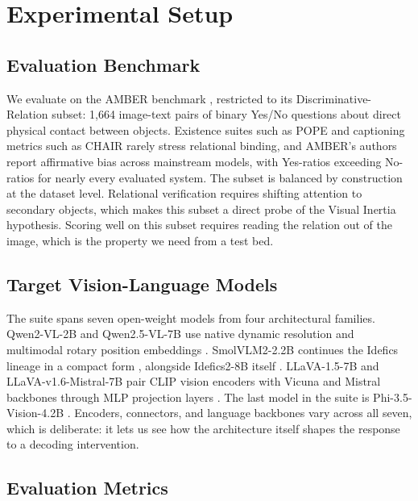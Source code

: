 \documentclass[pdflatex,sn-basic,Numbered]{sn-jnl}
\theoremstyle{thmstyleone}
\theoremstyle{thmstyletwo}
\theoremstyle{thmstylethree}
\begin{document}
\section{Experimental Setup}\label{sec:experiments}

\subsection{Evaluation Benchmark}\label{subsec:benchmark}

We evaluate on the AMBER benchmark \cite{wang2023amber}, restricted to its Discriminative-Relation subset: 1,664 image-text pairs of binary Yes/No questions about direct physical contact between objects. Existence suites such as POPE \cite{li2023bevaluating} and captioning metrics such as CHAIR \cite{rohrbach2018object} rarely stress relational binding, and AMBER's authors report affirmative bias across mainstream models, with Yes-ratios exceeding No-ratios for nearly every evaluated system. The subset is balanced by construction at the dataset level. Relational verification requires shifting attention to secondary objects, which makes this subset a direct probe of the Visual Inertia hypothesis. Scoring well on this subset requires reading the relation out of the image, which is the property we need from a test bed.

\subsection{Target Vision-Language Models}\label{subsec:models}

The suite spans seven open-weight models from four architectural families. Qwen2-VL-2B and Qwen2.5-VL-7B use native dynamic resolution and multimodal rotary position embeddings \cite{bai2025qwen25vl}. SmolVLM2-2.2B continues the Idefics lineage in a compact form \cite{marafioti2025smolvlm,laurencon2024matters}, alongside Idefics2-8B itself \cite{laurencon2024matters}. LLaVA-1.5-7B and LLaVA-v1.6-Mistral-7B pair CLIP vision encoders with Vicuna and Mistral backbones through MLP projection layers \cite{liu2023visual,liu2024improved}. The last model in the suite is Phi-3.5-Vision-4.2B \cite{abdin2024phi3}. Encoders, connectors, and language backbones vary across all seven, which is deliberate: it lets us see how the architecture itself shapes the response to a decoding intervention.

\subsection{Evaluation Metrics}\label{subsec:metrics}
\end{document}
